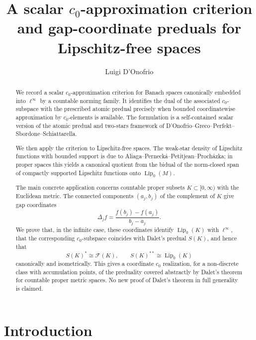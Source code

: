 \documentclass[11pt]{amsart}
\title[A scalar $c_0$-criterion and gap-coordinate preduals]
{A scalar $c_0$-approximation criterion and gap-coordinate preduals for Lipschitz-free spaces}
\author{Luigi D'Onofrio}
\theoremstyle{plain}
\theoremstyle{definition}
\theoremstyle{remark}
\newcommand{\Lip}{\operatorname{Lip}}
\newcommand{\F}{\mathcal F}
\begin{document}
\begin{abstract}
We record a scalar $c_0$-approximation criterion for Banach spaces
canonically embedded into $\ell^\infty$ by a countable norming family.
It identifies the dual of the associated $c_0$-subspace with the prescribed
atomic predual precisely when bounded coordinatewise approximation by
$c_0$-elements is available. The formulation is a self-contained scalar
version of the atomic predual and two-stars framework of
D'Onofrio--Greco--Perfekt--Sbordone--Schiattarella.

We then apply the criterion to Lipschitz-free spaces. The weak-star density
of Lipschitz functions with bounded support is due to
Aliaga--Perneck\'a--Petitjean--Proch\'azka; in proper spaces this yields a
canonical quotient from the bidual of the norm-closed span of compactly
supported Lipschitz functions onto $\Lip_0(M)$.

The main concrete application concerns countable proper subsets
$K\subset [0,\infty)$ with the Euclidean metric. The connected components
$(a_j,b_j)$ of the complement of $K$ give gap coordinates
\[
        \Delta_j f=\frac{f(b_j)-f(a_j)}{b_j-a_j}.
\]
We prove that, in the infinite case, these coordinates identify $\Lip_0(K)$ with $\ell^\infty$,
that the corresponding $c_0$-subspace coincides with Dalet's predual
$S(K)$, and hence that
\[
        S(K)^*\cong \F(K),\qquad S(K)^{**}\cong \Lip_0(K)
\]
canonically and isometrically. This gives a coordinate $c_0$ realization,
for a non-discrete class with accumulation points, of the preduality covered
abstractly by Dalet's theorem for countable proper metric spaces. No new
proof of Dalet's theorem in full generality is claimed.
\end{abstract}

\maketitle

\section{Introduction}
\end{document}
